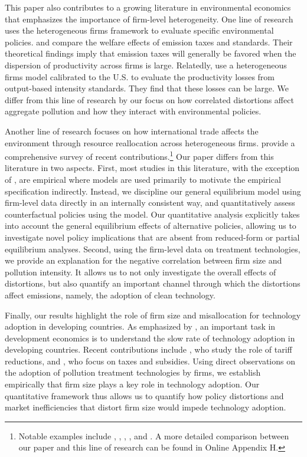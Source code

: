 \documentclass[AEJ]{AEA}
\begin{document}
This paper also contributes to a growing literature in environmental economics that emphasizes the importance of firm-level heterogeneity. One line of research uses the heterogeneous firms framework to evaluate specific environmental policies. \citet{LiSun:2015} and \citet{LiShi:2017} compare the welfare effects of emission taxes and standards. Their theoretical findings imply that emission taxes will generally be favored when the dispersion of productivity across firms is large. Relatedly, \citet{TombeWinter:2015} use a heterogeneous firms model calibrated to the U.S. to evaluate the productivity losses from output-based intensity standards. They find that these losses can be large. We differ from this line of research by our focus on how correlated distortions affect aggregate pollution and how they interact with environmental policies.

Another line of research focuses on how international trade affects the environment through resource reallocation across heterogeneous firms. \citet{Cherniwchanetal:2017} provide a comprehensive survey of recent contributions.\footnote{Notable examples include \citet{Martin:2013}, \citet{Cherniwchan:2017}, \citet{BarrowsOllivier:2016}, \citet{Forslidetal:2015}, and \citet{ShapiroWalker:2015}. A more detailed comparison between our paper and this line of research can be found in Online Appendix H.} Our paper differs from this literature in two aspects. First, most studies in this literature, with the exception of \citet{ShapiroWalker:2015}, are empirical where models are used primarily to motivate the empirical specification indirectly. Instead, we discipline our general equilibrium model using firm-level data directly in an internally consistent way, and quantitatively assess counterfactual policies using the model. Our quantitative analysis explicitly takes into account the general equilibrium effects of alternative policies, allowing us to investigate novel policy implications that are absent from reduced-form or partial equilibrium analyses. Second, using the firm-level data on treatment technologies, we provide an explanation for the negative correlation between firm size and pollution intensity. It allows us to not only investigate the overall effects of distortions, but also quantify an important channel through which the distortions affect emissions, namely, the adoption of clean technology.

Finally, our results highlight the role of firm size and misallocation for technology adoption in developing countries. As emphasized by \citet{ParentePrescott:1994, ParentePrescott:1999}, an important task in development economics is to understand the slow rate of technology adoption in developing countries. Recent contributions include \citet{Bustos:2011}, who study the role of tariff reductions, and \citet{Acemogluetal:2012}, who focus on taxes and subsidies. Using direct observations on the adoption of pollution treatment technologies by firms, we establish empirically that firm size plays a key role in technology adoption. Our quantitative framework thus allows us to quantify how policy distortions and market inefficiencies that distort firm size would impede technology adoption.
\end{document}
